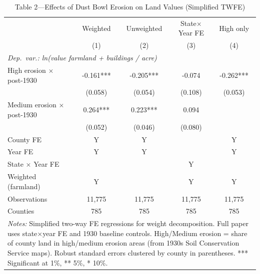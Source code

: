 \begin{table}[htbp]
\centering
\caption{Table 2---Effects of Dust Bowl Erosion on Land Values (Simplified TWFE)}
\label{tab:table2}
\begin{tabular}{lcccc}
\toprule
 & Weighted & Unweighted & State$\times$Year FE & High only \\
 & (1) & (2) & (3) & (4) \\
\midrule
\multicolumn{5}{l}{\textit{Dep.\ var.: ln(value farmland + buildings / acre)}} \\
\addlinespace
High erosion $\times$ post-1930 & -0.161*** & -0.205*** & -0.074 & -0.262*** \\
 & (0.058) & (0.054) & (0.108) & (0.053) \\
\addlinespace
Medium erosion $\times$ post-1930 & 0.264*** & 0.223*** & 0.094 & \\
 & (0.052) & (0.046) & (0.080) & \\
\addlinespace
County FE & Y & Y & & Y \\
Year FE & Y & Y & & Y \\
State $\times$ Year FE & & & Y & \\
Weighted (farmland) & Y & & Y & Y \\
\addlinespace
Observations & 11,775 & 11,775 & 11,775 & 11,775 \\
Counties & 785 & 785 & 785 & 785 \\
\bottomrule
\multicolumn{5}{p{0.95\linewidth}}{\footnotesize
 \textit{Notes:} Simplified two-way FE regressions for weight decomposition.
 Full paper uses state$\times$year FE and 1930 baseline controls.
 High/Medium erosion = share of county land in high/medium erosion areas
 (from 1930s Soil Conservation Service maps).
 Robust standard errors clustered by county in parentheses.
 *** Significant at 1\%, ** 5\%, * 10\%.}
\end{tabular}
\end{table}
